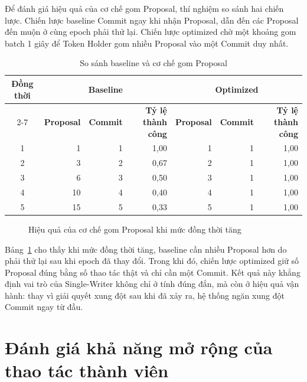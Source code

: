 \documentclass[../DoAn.tex]{subfiles}
\begin{document}
	Để đánh giá hiệu quả của cơ chế gom Proposal, thí nghiệm so sánh hai chiến lược. Chiến lược baseline Commit ngay khi nhận Proposal, dẫn đến các Proposal đến muộn ở cùng epoch phải thử lại. Chiến lược optimized chờ một khoảng gom batch 1 giây để Token Holder gom nhiều Proposal vào một Commit duy nhất.
	
	\begin{table}[htbp]
		\centering
		\caption{So sánh baseline và cơ chế gom Proposal}
		\label{tab:concurrency_results}
		\begin{tabular}{|c|r|r|r|r|r|r|}
			\hline
			\textbf{Đồng thời} & \multicolumn{3}{c|}{\textbf{Baseline}} & \multicolumn{3}{c|}{\textbf{Optimized}} \\
			\cline{2-7}
			& \textbf{Proposal} & \textbf{Commit} & \textbf{Tỷ lệ thành công} & \textbf{Proposal} & \textbf{Commit} & \textbf{Tỷ lệ thành công} \\
			\hline
			1 & 1 & 1 & 1,00 & 1 & 1 & 1,00 \\
			\hline
			2 & 3 & 2 & 0,67 & 2 & 1 & 1,00 \\
			\hline
			3 & 6 & 3 & 0,50 & 3 & 1 & 1,00 \\
			\hline
			4 & 10 & 4 & 0,40 & 4 & 1 & 1,00 \\
			\hline
			5 & 15 & 5 & 0,33 & 5 & 1 & 1,00 \\
			\hline
		\end{tabular}
	\end{table}
	
	\begin{figure}[htbp]
		\centering
		\caption{Hiệu quả của cơ chế gom Proposal khi mức đồng thời tăng}
		\label{fig:concurrency_batching}
	\end{figure}
	
	Bảng~\ref{tab:concurrency_results} cho thấy khi mức đồng thời tăng, baseline cần nhiều Proposal hơn do phải thử lại sau khi epoch đã thay đổi. Trong khi đó, chiến lược optimized giữ số Proposal đúng bằng số thao tác thật và chỉ cần một Commit. Kết quả này khẳng định vai trò của Single-Writer không chỉ ở tính đúng đắn, mà còn ở hiệu quả vận hành: thay vì giải quyết xung đột sau khi đã xảy ra, hệ thống ngăn xung đột Commit ngay từ đầu.
	
	\section{Đánh giá khả năng mở rộng của thao tác thành viên}
	\label{sec:danh_gia_scalability}
	
\end{document}
